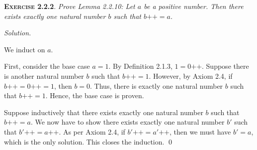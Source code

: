 \documentclass[12pt]{article}
\newcommand{\succr}[1]{#1 \textrm{++}}
\theoremstyle{remark}
\newenvironment{exer}[2]{
    \noindent \setlength{\parskip}{1em}%
    \textsc{\textbf{Exercise #1}}. \textit{#2} \par
    \noindent \textit{Solution.} %
}{\bigskip}
\begin{document}
\begin{exer}{2.2.2}{
    Prove Lemma 2.2.10:
    Let $a$ be a positive number.
    Then there exists exactly one natural number $b$ such that $\succr{b} = a$.
}
    We induct on $a$.
    
    First, consider the base case $a = 1$.
    By Definition 2.1.3, $1 = \succr{0}$.
    Suppose there is another natural number $b$ such that $\succr{b} = 1$.
    However, by Axiom 2.4, if $\succr{b} = \succr{0} = 1$, then $b = 0$.
    Thus, there is exactly one natural number $b$ such that $\succr{b} = 1$.
    Hence, the base case is proven.

    Suppose inductively that there exists exactly one natural number $b$ such that $\succr{b} = a$.
    We now have to show there exists exactly one natural number $b'$ such that $\succr{b'} = \succr{a}$.
    As per Axiom 2.4, if $\succr{b'} = \succr{a'}$, then we must have $b' = a$, which is the only solution.
    This closes the induction. \qed
\end{exer}
\end{document}
